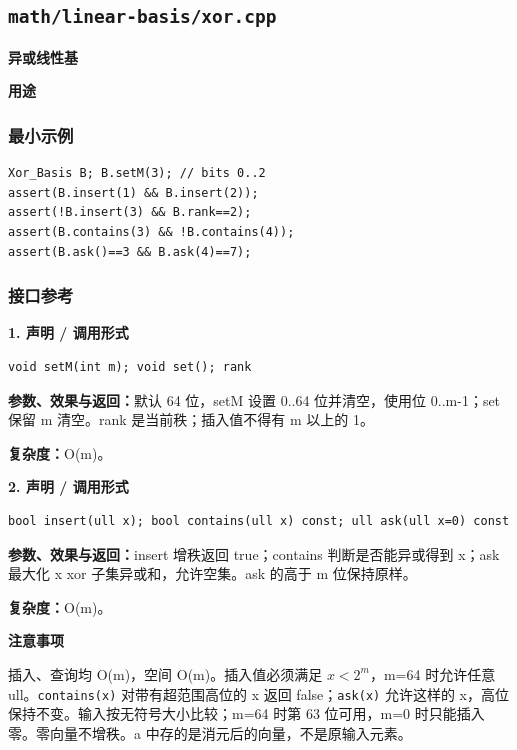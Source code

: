 \documentclass[UTF8,a4paper,10pt]{ctexart}
\newcommand{\TemplUsage}[1]{\textbf{用途}\par #1\par}
\newcommand{\TemplNote}[1]{\textbf{注意事项}\par #1\par}
\begin{document}
\subsection{\texttt{math/linear-basis/xor.cpp}}
\textbf{异或线性基}\par
\TemplUsage{}
\subsubsection*{最小示例}
\begin{lstlisting}
Xor_Basis B; B.setM(3); // bits 0..2
assert(B.insert(1) && B.insert(2));
assert(!B.insert(3) && B.rank==2);
assert(B.contains(3) && !B.contains(4));
assert(B.ask()==3 && B.ask(4)==7);
\end{lstlisting}
\subsubsection*{接口参考}
\noindent\begin{minipage}{\textwidth}
\textbf{1. 声明 / 调用形式}
\begin{lstlisting}
void setM(int m); void set(); rank
\end{lstlisting}
\textbf{参数、效果与返回：}默认 64 位，setM 设置 0..64 位并清空，使用位 0..m-1；set 保留 m 清空。rank 是当前秩；插入值不得有 m 以上的 1。

\textbf{复杂度：}O(m)。

\end{minipage}\par\vspace{0.4em}
\noindent\begin{minipage}{\textwidth}
\textbf{2. 声明 / 调用形式}
\begin{lstlisting}
bool insert(ull x); bool contains(ull x) const; ull ask(ull x=0) const
\end{lstlisting}
\textbf{参数、效果与返回：}insert 增秩返回 true；contains 判断是否能异或得到 x；ask 最大化 x xor 子集异或和，允许空集。ask 的高于 m 位保持原样。

\textbf{复杂度：}O(m)。

\TemplNote{插入、查询均 O(m)，空间 O(m)。插入值必须满足 $x<2^m$，m=64 时允许任意 ull。\texttt{contains(x)} 对带有超范围高位的 x 返回 false；\texttt{ask(x)} 允许这样的 x，高位保持不变。输入按无符号大小比较；m=64 时第 63 位可用，m=0 时只能插入零。零向量不增秩。a 中存的是消元后的向量，不是原输入元素。}
\end{minipage}\par\vspace{0.4em}
\clearpage
\end{document}

